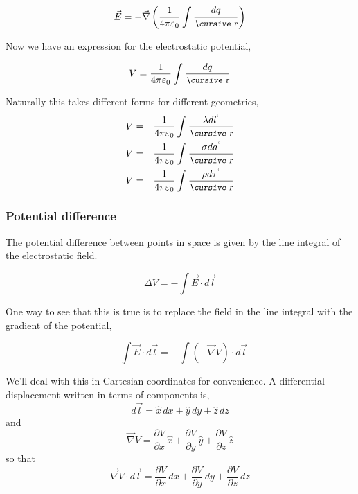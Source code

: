 \documentclass[12pt]{article}
\begin{document}
\begin{flushleft}
\begin{equation*}
\vec{E}=-\vec{\nabla} \left( \frac{1}{4\pi \varepsilon_{0}} \int \frac{dq}{\text{\small\slshape\cursive r}}  \right)
\end{equation*}

Now we have an expression for the electrostatic potential,

\begin{equation*}
V = \frac{1}{4\pi \varepsilon_{0}} \int \frac{dq}{\text{\small\slshape\cursive r}}
\end{equation*}

Naturally this takes different forms for different geometries,
\begin{eqnarray*}
V & = &\frac{1}{4\pi \varepsilon_{0}} \int \frac{\lambda dl^{`}}{\text{\small\slshape\cursive r}} \\
V & = & \frac{1}{4\pi \varepsilon_{0}} \int \frac{\sigma da^{`}}{\text{\small\slshape\cursive r}} \\
V & = & \frac{1}{4\pi \varepsilon_{0}} \int \frac{\rho d\tau^{`}}{\text{\small\slshape\cursive r}} 
\end{eqnarray*}

\subsubsection*{Potential difference}

The potential difference between points in space is given by the line integral of the electrostatic field. 

\begin{equation}
\Delta V = - \int \vec{E} \cdot  d\vec{l} 
\label{eq:potdiff}
\end{equation}

\vspace{.2in}
One way to see that this is true is to replace the field in the line integral with the gradient of the potential,

\[
- \int \vec{E} \cdot  d\vec{l} =  - \int \left( -\vec{\nabla}V \right) \cdot  d\vec{l} 
\]

We'll deal with this in Cartesian coordinates for convenience.  A differential displacement written in terms of components is,
\[
d\vec{l}=\hat{x} \, dx+\hat{y} \, dy+\hat{z} \, dz
\]
and
\[
\vec{\nabla}V = \frac{\partial V}{\partial x} \, \hat{x} + \frac{\partial V}{\partial y} \, \hat{y} +\frac{\partial V}{\partial z} \, \hat{z}
\]
so that
\[
\vec{\nabla}V \cdot d\vec{l} = \frac{\partial V}{\partial x} \, dx + \frac{\partial V}{\partial y} \, dy +\frac{\partial V}{\partial z} \, dz
\]


\end{flushleft}
\end{document}
